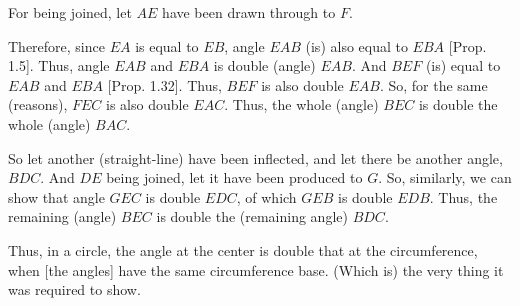 \begin{Parallel}{}{}
{For being joined, let $AE$ have been drawn through to $F$.

Therefore, since $EA$ is equal to $EB$, angle $EAB$ (is) also equal to
$EBA$ [Prop. 1.5]. Thus, angle $EAB$ and $EBA$ is double (angle) $EAB$.
And $BEF$ (is) equal to $EAB$ and $EBA$ [Prop. 1.32]. Thus, $BEF$ is also
double $EAB$. So, for the same (reasons), $FEC$ is also double $EAC$. Thus,
the whole (angle) $BEC$ is double the whole (angle) $BAC$.

\epsfysize=2.2in
\centerline{}

So let another  (straight-line)  have  been inflected, and let there be another
angle, $BDC$. And $DE$ being joined, let it have been produced to $G$.
So, similarly, we can show that angle $GEC$ is double $EDC$, of which
$GEB$ is double $EDB$. Thus, the remaining (angle) $BEC$ is double
the (remaining angle) $BDC$.

Thus, in a circle, the angle at the center is double that at the circumference, when
[the angles] have the same circumference base. (Which is) the very thing it
was required to show.}
\end{Parallel}

